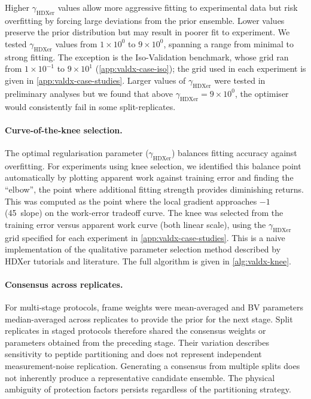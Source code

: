 Higher $\gamma_\text{HDXer}$ values allow more aggressive fitting to experimental data but risk overfitting by forcing large deviations from the prior ensemble. Lower values preserve the prior distribution but may result in poorer fit to experiment. We tested $\gamma_\text{HDXer}$ values from $1\times10^0$ to $9\times10^0$, spanning a range from minimal to strong fitting. The exception is the Iso-Validation benchmark, whose grid ran from $1\times10^{-1}$ to $9\times10^{1}$ (\cref{app:valdx-case-iso}); the grid used in each experiment is given in \cref{app:valdx-case-studies}. Larger values of $\gamma_\text{HDXer}$ were tested in preliminary analyses but we found that above $\gamma_\text{HDXer}=9\times10^0$, the optimiser would consistently fail in some split-replicates.

\paragraph{Curve-of-the-knee selection.}
The optimal regularisation parameter ($\gamma_\text{HDXer}$) balances fitting accuracy against overfitting. For experiments using knee selection, we identified this balance point automatically by plotting apparent work against training error and finding the ``elbow'', the point where additional fitting strength provides diminishing returns. This was computed as the point where the local gradient approaches $-1$ (45\textdegree\ slope) on the work-error tradeoff curve. The knee was selected from the training error versus apparent work curve (both linear scale), using the $\gamma_\text{HDXer}$ grid specified for each experiment in \cref{app:valdx-case-studies}. This is a naive implementation of the qualitative parameter selection method described by HDXer tutorials and literature.\supercite{leeInterpretingHydrogenDeuteriumExchange2021,bradshawInterpretationHDXData2020} The full algorithm is given in \cref{alg:valdx-knee}.

\paragraph{Consensus across replicates.}
For multi-stage protocols, frame weights were mean-averaged and BV parameters median-averaged across replicates to provide the prior for the next stage. Split replicates in staged protocols therefore shared the consensus weights or parameters obtained from the preceding stage. Their variation describes sensitivity to peptide partitioning and does not represent independent measurement-noise replication. Generating a consensus from multiple splits does not inherently produce a representative candidate ensemble. The physical ambiguity of protection factors persists regardless of the partitioning strategy.

